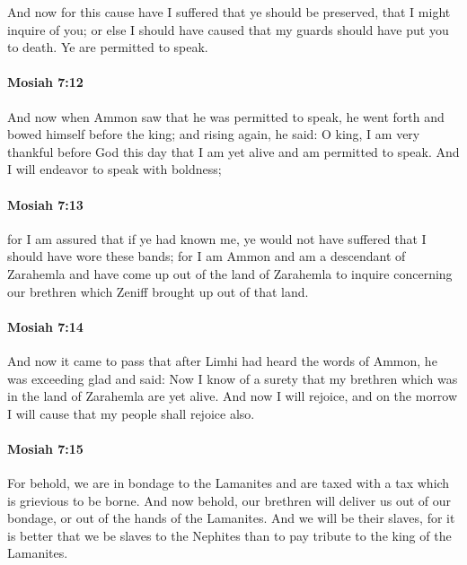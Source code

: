			And now for this cause have I suffered that ye should be preserved,
			that I might inquire of you;
			or else I should have caused that my guards should have put you to death.
			Ye are permitted to speak.

		\paragraph{Mosiah 7:12} %
			\label{MOSIAH-7-12}

			And now when Ammon saw that he was permitted to speak,
			he went forth and bowed himself before the king;
			and rising again, he said:
			O king, I am very thankful before God this day
			that I am yet alive and am permitted to speak.
			And I will endeavor to speak with boldness;

		\paragraph{Mosiah 7:13} %
			\label{MOSIAH-7-13}

			for I am assured that if ye had known me,
			ye would not have suffered that I should have wore these bands;
			for I am Ammon and am a descendant of Zarahemla
			and have come up out of the land of Zarahemla
			to inquire concerning our brethren which Zeniff brought up out of that land.

		\paragraph{Mosiah 7:14} %
			\label{MOSIAH-7-14}

			And now it came to pass that
			after Limhi had heard the words of Ammon,
			he was exceeding glad and said:
			Now I know of a surety
			that my brethren which was in the land of Zarahemla are yet alive.
			And now I will rejoice,
			and on the morrow I will cause that my people shall rejoice also.

		\paragraph{Mosiah 7:15} %
			\label{MOSIAH-7-15}

			For behold, we are in bondage to the Lamanites
			and are taxed with a tax which is grievious to be borne.
			And now behold, our brethren will deliver us out of our bondage,
			or out of the hands of the Lamanites.
			And we will be their slaves,
			for it is better that we be slaves to the Nephites
			than to pay tribute to the king of the Lamanites.

